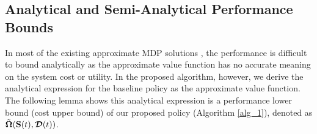 \subsection{Analytical and Semi-Analytical Performance Bounds}
\label{subsec:analysis}
In most of the existing approximate MDP solutions \cite{mdp-bound1,mdp-bound2,mdp-bound3}, the performance is difficult to bound analytically as the approximate value function has no accurate meaning on the system cost or utility.
In the proposed algorithm, however, we derive the analytical expression for the baseline policy as the approximate value function.
The following lemma shows this analytical expression is a performance lower bound (cost upper bound) of our proposed policy (Algorithm \ref{alg_1}), {denoted as $\tilde{\boldsymbol{\Omega}}(\mathbf{S}(t), \boldsymbol{\mathcal{D}}(t))$}.
